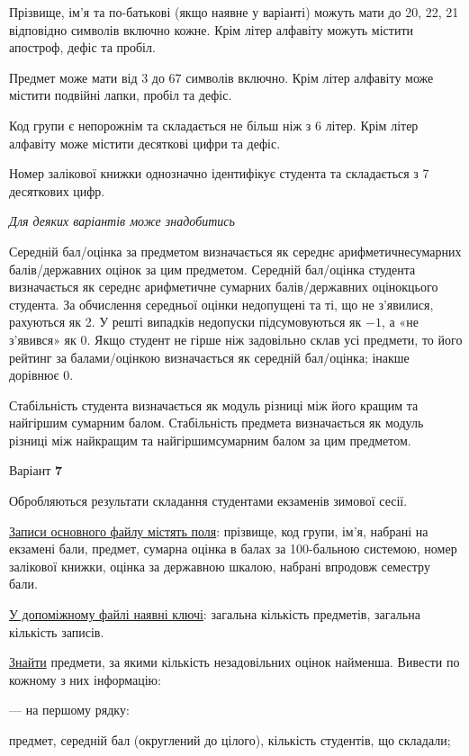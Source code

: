 \documentclass[11pt, ukrainian]{article}
\begin{document}
Прізвище, ім’я та по-батькові (якщо наявне у варіанті) можуть мати до 20, 22, 21 відповідно символів включно кожне. 
Крім літер алфавіту можуть містити апостроф, дефіс та пробіл.

Предмет може мати від 3 до 67 символів включно. 
Крім літер алфавіту може містити подвійні лапки, пробіл та дефіс.

Код групи є непорожнім та складається не більш ніж з 6 літер. 
Крім літер алфавіту може містити десяткові цифри та дефіс.


Номер залікової книжки однозначно ідентифікує студента та складається з 7 десяткових цифр. 

\bigskip\textit{Для деяких варіантів може знадобитись}

Середній бал/оцінка за предметом визначається як середнє арифметичнесумарних балів/державних оцінок за цим предметом. 
Середній бал/оцінка студента визначається як середнє арифметичне сумарних балів/державних оцінокцього студента. 
За обчислення середньої оцінки недопущені та ті, що не з’явилися, рахуються як 2.
У решті випадків недопуски підсумовуються як $-1$, а «не з’явився» як 0.
Якщо студент не гірше ніж задовільно склав усі предмети, 
то його рейтинг за балами/оцінкою визначається як середній бал/оцінка; інакше дорівнює 0.

Стабільність студента визначається як модуль різниці між його кращим та найгіршим сумарним балом.
Стабільність предмета визначається як модуль різниці між найкращим та найгіршимсумарним балом за цим предметом.






\par
\newpage
{\center Варіант  \No \textbf { 7 }\par}
\bigskip
Обробляються результати складання студентами екзаменів зимової сесії.

\underline{Записи основного файлу містять поля}: прізвище, код групи, ім’я, набрані на екзамені бали, предмет, сумарна оцінка в балах за 100-бальною системою, номер залікової книжки, оцінка за державною шкалою, набрані впродовж семестру бали.

\underline{У допоміжному файлі наявні ключі}: загальна кількість предметів, загальна кількість записів.

\underline{Знайти} предмети, за якими кількість незадовільних оцінок найменша. Вивести по кожному з них інформацію:\par
{\noindent}--- на першому рядку:\par
предмет, середній бал (округлений до цілого), кількість студентів, що складали;
\end{document}
